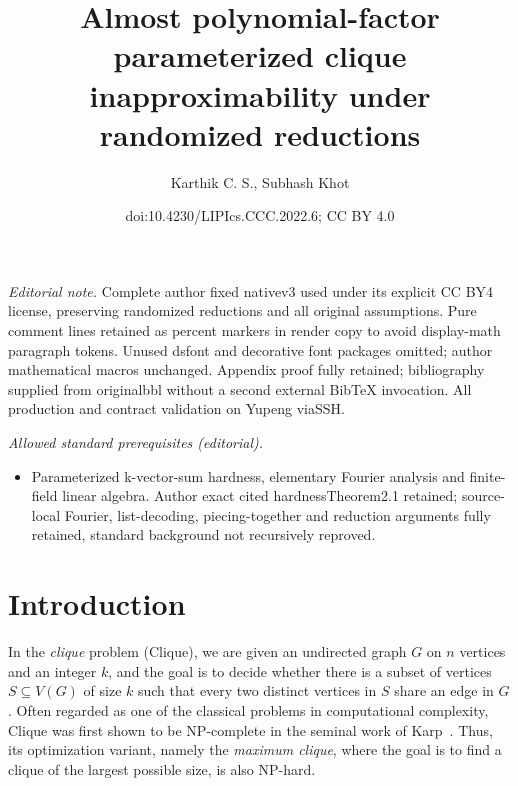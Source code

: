 \documentclass[10pt,a4paper]{article}
\title{Almost polynomial-factor parameterized clique inapproximability under randomized reductions}
\author{Karthik C. S., Subhash Khot}
\date{doi:10.4230/LIPIcs.CCC.2022.6; CC BY 4.0}
\begin{document}
\maketitle
\noindent\textit{Editorial note.} Complete author fixed nativev3 used under its explicit CC BY4 license, preserving randomized reductions and all original assumptions. Pure comment lines retained as percent markers in render copy to avoid display-math paragraph tokens. Unused dsfont and decorative font packages omitted; author mathematical macros unchanged. Appendix proof fully retained; bibliography supplied from originalbbl without a second external BibTeX invocation. All production and contract validation on Yupeng viaSSH.\par\medskip
\noindent\textit{Allowed standard prerequisites (editorial).}\begin{itemize}
\item Parameterized k-vector-sum hardness, elementary Fourier analysis and finite-field linear algebra. Author exact cited hardnessTheorem2.1 retained; source-local Fourier, list-decoding, piecing-together and reduction arguments fully retained, standard background not recursively reproved.
\end{itemize}\medskip
\section{Introduction}
In the {\em clique} problem (Clique), we are given an undirected graph $G$ on $n$ vertices and an integer $k$, and the goal is to decide whether there is a subset of vertices $S\subseteq V(G)$ of size $k$ such that every two distinct vertices in $S$ share an edge in $G$. 
%
Often regarded as one of the classical problems in computational complexity, Clique was first shown to be NP-complete in the seminal work of Karp~\cite{Karp72}. Thus, its optimization variant, namely the {\em maximum clique}, where the goal is to find a clique of the largest possible size, is also  NP-hard. 
\end{document}
